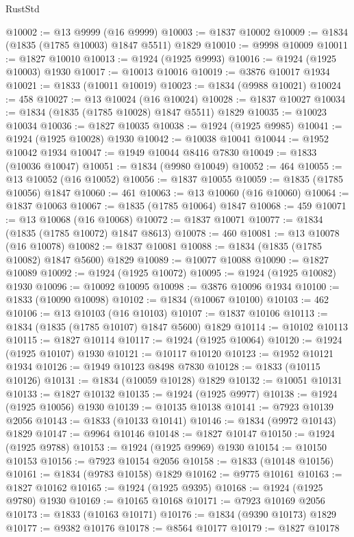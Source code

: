 \begin{lexlean}{RustStd}
\begin{coremodule}
@10002 := @13 @9999 (@16 @9999)
@10003 := @1837 @10002
@10009 := @1834 (@1835 (@1785 @10003) @1847 @5511) @1829
@10010 := @9998 @10009
@10011 := @1827 @10010
@10013 := @1924 (@1925 @9993)
@10016 := @1924 (@1925 @10003) @1930
@10017 := @10013 @10016
@10019 := @3876 @10017 @1934
@10021 := @1833 (@10011 @10019)
@10023 := @1834 (@9988 @10021)
@10024 := 458
@10027 := @13 @10024 (@16 @10024)
@10028 := @1837 @10027
@10034 := @1834 (@1835 (@1785 @10028) @1847 @5511) @1829
@10035 := @10023 @10034
@10036 := @1827 @10035
@10038 := @1924 (@1925 @9985)
@10041 := @1924 (@1925 @10028) @1930
@10042 := @10038 @10041
@10044 := @1952 @10042 @1934
@10047 := @1949 @10044 @8416 @7830
@10049 := @1833 (@10036 @10047)
@10051 := @1834 (@9980 @10049)
@10052 := 464
@10055 := @13 @10052 (@16 @10052)
@10056 := @1837 @10055
@10059 := @1835 (@1785 @10056) @1847
@10060 := 461
@10063 := @13 @10060 (@16 @10060)
@10064 := @1837 @10063
@10067 := @1835 (@1785 @10064) @1847
@10068 := 459
@10071 := @13 @10068 (@16 @10068)
@10072 := @1837 @10071
@10077 := @1834 (@1835 (@1785 @10072) @1847 @8613)
@10078 := 460
@10081 := @13 @10078 (@16 @10078)
@10082 := @1837 @10081
@10088 := @1834 (@1835 (@1785 @10082) @1847 @5600) @1829
@10089 := @10077 @10088
@10090 := @1827 @10089
@10092 := @1924 (@1925 @10072)
@10095 := @1924 (@1925 @10082) @1930
@10096 := @10092 @10095
@10098 := @3876 @10096 @1934
@10100 := @1833 (@10090 @10098)
@10102 := @1834 (@10067 @10100)
@10103 := 462
@10106 := @13 @10103 (@16 @10103)
@10107 := @1837 @10106
@10113 := @1834 (@1835 (@1785 @10107) @1847 @5600) @1829
@10114 := @10102 @10113
@10115 := @1827 @10114
@10117 := @1924 (@1925 @10064)
@10120 := @1924 (@1925 @10107) @1930
@10121 := @10117 @10120
@10123 := @1952 @10121 @1934
@10126 := @1949 @10123 @8498 @7830
@10128 := @1833 (@10115 @10126)
@10131 := @1834 (@10059 @10128) @1829
@10132 := @10051 @10131
@10133 := @1827 @10132
@10135 := @1924 (@1925 @9977)
@10138 := @1924 (@1925 @10056) @1930
@10139 := @10135 @10138
@10141 := @7923 @10139 @2056
@10143 := @1833 (@10133 @10141)
@10146 := @1834 (@9972 @10143) @1829
@10147 := @9964 @10146
@10148 := @1827 @10147
@10150 := @1924 (@1925 @9788)
@10153 := @1924 (@1925 @9969) @1930
@10154 := @10150 @10153
@10156 := @7923 @10154 @2056
@10158 := @1833 (@10148 @10156)
@10161 := @1834 (@9783 @10158) @1829
@10162 := @9775 @10161
@10163 := @1827 @10162
@10165 := @1924 (@1925 @9395)
@10168 := @1924 (@1925 @9780) @1930
@10169 := @10165 @10168
@10171 := @7923 @10169 @2056
@10173 := @1833 (@10163 @10171)
@10176 := @1834 (@9390 @10173) @1829
@10177 := @9382 @10176
@10178 := @8564 @10177
@10179 := @1827 @10178

\end{coremodule}
\end{lexlean}
